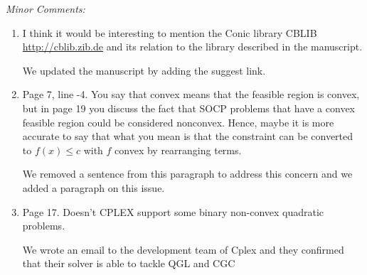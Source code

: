 \documentclass[11pt]{article}
\newcommand{\rep}[1]{{\textcolor{acblue}{#1}}}
\newcommand{\leo}[1]{{\color{red}#1}}
\begin{document}
{\it
Minor Comments:
\begin{enumerate}

\item I think it would be interesting to mention the Conic library CBLIB \url{http://cblib.zib.de} and its relation to the library described in the manuscript.

\rep{We updated the manuscript by adding the suggest link.}


\item Page 7, line -4. You say that convex means that the feasible region is
convex, but in page 19 you discuss the fact that SOCP problems that have
a convex feasible region could be considered nonconvex. Hence, maybe it
is more accurate to say that what you mean is that the constraint can be
converted to $f (x) \le c$ with $f$ convex by rearranging terms.

\rep{We removed a sentence from this paragraph to address this concern and we added a paragraph on this issue.
}

\item Page 17. Doesn't CPLEX support some binary non-convex quadratic
problems.

\rep{We wrote an email to the development team of Cplex and they confirmed that their solver is able to tackle QGL and CGC 
}


\end{enumerate}}
\end{document}
